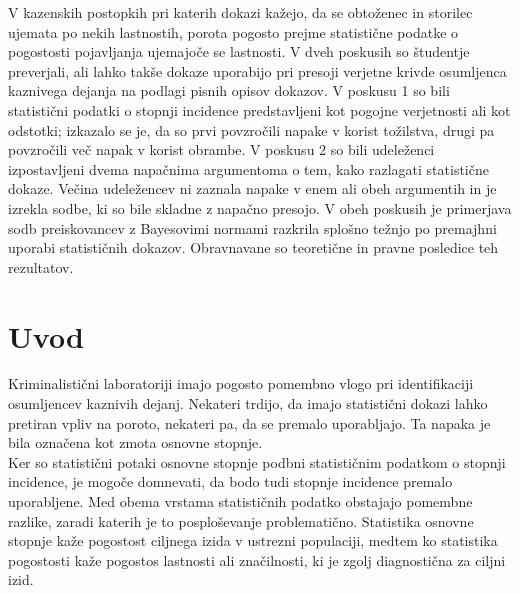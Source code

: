 \documentclass[12pt,a4paper]{amsart}
\theoremstyle{definition} %
\theoremstyle{plain} %
\begin{document}
\title{}
\author{Neža Kržan}
\maketitle
V kazenskih postopkih pri katerih dokazi kažejo, da se obtoženec in storilec ujemata po nekih lastnostih, porota pogosto prejme statistične 
podatke o pogostosti pojavljanja ujemajoče se lastnosti. V dveh poskusih so študentje preverjali, ali lahko takše dokaze uporabijo pri presoji 
verjetne krivde osumljenca kaznivega dejanja na podlagi pisnih opisov dokazov. V poskusu 1 so bili statistični podatki o stopnji incidence 
predstavljeni kot pogojne verjetnosti ali kot odstotki; izkazalo se je, da so prvi povzročili napake v korist tožilstva, drugi pa povzročili več 
napak v korist obrambe. V poskusu 2 so bili udeleženci izpostavljeni dvema napačnima argumentoma o tem, kako razlagati statistične dokaze. Večina 
udeležencev ni zaznala napake v enem ali obeh argumentih in je izrekla sodbe, ki so bile skladne z napačno presojo. V obeh poskusih je primerjava 
sodb preiskovancev z Bayesovimi normami razkrila splošno težnjo po premajhni uporabi statističnih dokazov. Obravnavane so teoretične in pravne 
posledice teh rezultatov.

\section{Uvod}
Kriminalistični laboratoriji imajo pogosto pomembno vlogo pri identifikaciji osumljencev kaznivih dejanj. Nekateri trdijo, da imajo statistični 
dokazi lahko pretiran vpliv na poroto, nekateri pa, da se premalo uporabljajo. Ta napaka je bila označena kot zmota osnovne stopnje. \\
Ker so statistični potaki osnovne stopnje podbni statističnim podatkom o stopnji incidence, je mogoče domnevati, da bodo tudi stopnje incidence 
premalo uporabljene. Med obema vrstama statističnih podatko obstajajo pomembne razlike, zaradi katerih je to posploševanje problematično. Statistika 
osnovne stopnje kaže pogostost ciljnega izida v ustrezni populaciji, medtem ko statistika pogostosti kaže pogostos lastnosti ali značilnosti, ki je zgolj 
diagnostična za ciljni izid.  \\
\end{document}
